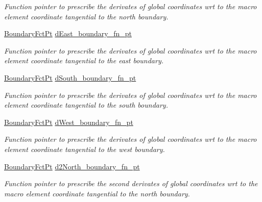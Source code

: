 \begin{DoxyCompactItemize}
\begin{DoxyCompactList}\small\item\em Function pointer to prescribe the derivates of global coordinates wrt to the macro element coordinate tangential to the north boundary. \end{DoxyCompactList}\item 
\hyperlink{classoomph_1_1TopologicallyRectangularDomain_a8b2e24f5500d86c93aef509c5410e7cc}{Boundary\+Fct\+Pt} \hyperlink{classoomph_1_1TopologicallyRectangularDomain_a535ff2d7f9561425d9fd4b0d57bbc769}{d\+East\+\_\+boundary\+\_\+fn\+\_\+pt}
\begin{DoxyCompactList}\small\item\em Function pointer to prescribe the derivates of global coordinates wrt to the macro element coordinate tangential to the east boundary. \end{DoxyCompactList}\item 
\hyperlink{classoomph_1_1TopologicallyRectangularDomain_a8b2e24f5500d86c93aef509c5410e7cc}{Boundary\+Fct\+Pt} \hyperlink{classoomph_1_1TopologicallyRectangularDomain_aeaea9592b94d26a6a23f4f425ee7cd37}{d\+South\+\_\+boundary\+\_\+fn\+\_\+pt}
\begin{DoxyCompactList}\small\item\em Function pointer to prescribe the derivates of global coordinates wrt to the macro element coordinate tangential to the south boundary. \end{DoxyCompactList}\item 
\hyperlink{classoomph_1_1TopologicallyRectangularDomain_a8b2e24f5500d86c93aef509c5410e7cc}{Boundary\+Fct\+Pt} \hyperlink{classoomph_1_1TopologicallyRectangularDomain_a8e3abcbc75bab984017cb974d81db41e}{d\+West\+\_\+boundary\+\_\+fn\+\_\+pt}
\begin{DoxyCompactList}\small\item\em Function pointer to prescribe the derivates of global coordinates wrt to the macro element coordinate tangential to the west boundary. \end{DoxyCompactList}\item 
\hyperlink{classoomph_1_1TopologicallyRectangularDomain_a8b2e24f5500d86c93aef509c5410e7cc}{Boundary\+Fct\+Pt} \hyperlink{classoomph_1_1TopologicallyRectangularDomain_a18674c5ad527a43b1fd3e3bdc15fff8f}{d2\+North\+\_\+boundary\+\_\+fn\+\_\+pt}
\begin{DoxyCompactList}\small\item\em Function pointer to prescribe the second derivates of global coordinates wrt to the macro element coordinate tangential to the north boundary. \end{DoxyCompactList}\item 

\end{DoxyCompactItemize}
